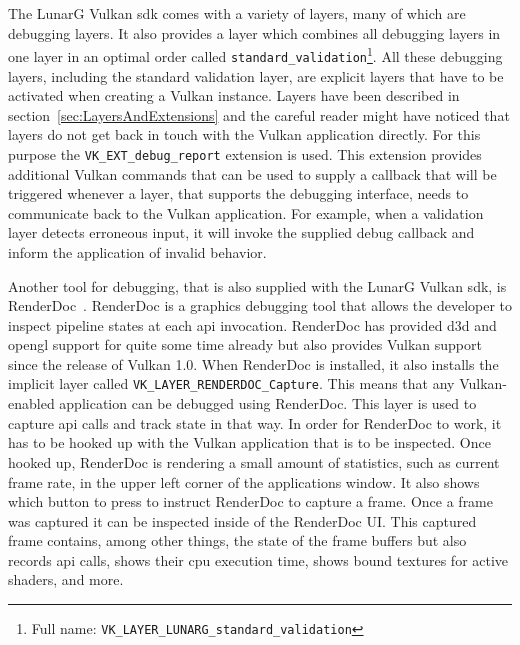     The LunarG Vulkan \gls{sdk} comes with a variety of layers, many of which are debugging layers.
    It also provides a layer which combines all debugging layers in one layer in an optimal order called \lstinline{standard_validation}\footnote{Full name: \lstinline{VK_LAYER_LUNARG_standard_validation}}.
    All these debugging layers, including the standard validation layer, are explicit layers that have to be activated when creating a Vulkan instance.
    Layers have been described in section~\ref{sec:LayersAndExtensions} and the careful reader might have noticed that layers do not get back in touch with the Vulkan application directly.
    For this purpose the \lstinline{VK_EXT_debug_report} extension is used.
    This extension provides additional Vulkan commands that can be used to supply a callback that will be triggered whenever a layer, that supports the debugging interface, needs to communicate back to the Vulkan application.
    For example, when a validation layer detects erroneous input, it will invoke the supplied debug callback and inform the application of invalid behavior.

    Another tool for debugging, that is also supplied with the LunarG Vulkan \gls{sdk}, is RenderDoc~\cite{renderdoc}.
    RenderDoc is a graphics debugging tool that allows the developer to inspect pipeline states at each \gls{api} invocation.
    RenderDoc has provided \gls{d3d} and \gls{opengl} support for quite some time already but also provides Vulkan support since the release of Vulkan 1.0.
    When RenderDoc is installed, it also installs the implicit layer called \lstinline{VK_LAYER_RENDERDOC_Capture}.
    This means that any Vulkan-enabled application can be debugged using RenderDoc.
    This layer is used to capture \gls{api} calls and track state in that way.
    In order for RenderDoc to work, it has to be hooked up with the Vulkan application that is to be inspected.
    Once hooked up, RenderDoc is rendering a small amount of statistics, such as current frame rate, in the upper left corner of the applications window.
    It also shows which button to press to instruct RenderDoc to capture a frame.
    Once a frame was captured it can be inspected inside of the RenderDoc UI.
    This captured frame contains, among other things, the state of the frame buffers but also records \gls{api} calls, shows their \gls{cpu} execution time, shows bound textures for active shaders, and more.

